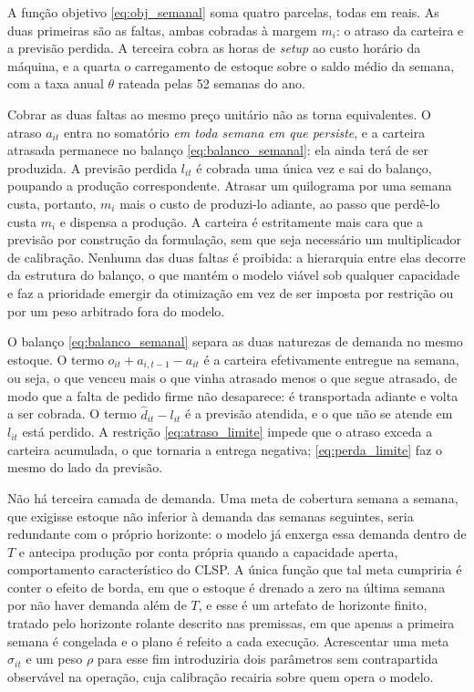 \documentclass[fleqn,12pt,a4paper]{article}
\begin{document}
A função objetivo \eqref{eq:obj_semanal} soma quatro parcelas, todas em reais. As duas primeiras são as faltas, ambas cobradas à margem $m_i$: o atraso da carteira e a previsão perdida. A terceira cobra as horas de \textit{setup} ao custo horário da máquina, e a quarta o carregamento de estoque sobre o saldo médio da semana, com a taxa anual $\theta$ rateada pelas 52 semanas do ano.

Cobrar as duas faltas ao mesmo preço unitário não as torna equivalentes. O atraso $a_{it}$ entra no somatório \emph{em toda semana em que persiste}, e a carteira atrasada permanece no balanço \eqref{eq:balanco_semanal}: ela ainda terá de ser produzida. A previsão perdida $l_{it}$ é cobrada uma única vez e sai do balanço, poupando a produção correspondente. Atrasar um quilograma por uma semana custa, portanto, $m_i$ mais o custo de produzi-lo adiante, ao passo que perdê-lo custa $m_i$ e dispensa a produção. A carteira é estritamente mais cara que a previsão por construção da formulação, sem que seja necessário um multiplicador de calibração. Nenhuma das duas faltas é proibida: a hierarquia entre elas decorre da estrutura do balanço, o que mantém o modelo viável sob qualquer capacidade e faz a prioridade emergir da otimização em vez de ser imposta por restrição ou por um peso arbitrado fora do modelo.

O balanço \eqref{eq:balanco_semanal} separa as duas naturezas de demanda no mesmo estoque. O termo $o_{it} + a_{i,t-1} - a_{it}$ é a carteira efetivamente entregue na semana, ou seja, o que venceu mais o que vinha atrasado menos o que segue atrasado, de modo que a falta de pedido firme não desaparece: é transportada adiante e volta a ser cobrada. O termo $\hat{d}_{it} - l_{it}$ é a previsão atendida, e o que não se atende em $l_{it}$ está perdido. A restrição \eqref{eq:atraso_limite} impede que o atraso exceda a carteira acumulada, o que tornaria a entrega negativa; \eqref{eq:perda_limite} faz o mesmo do lado da previsão.

Não há terceira camada de demanda. Uma meta de cobertura semana a semana, que exigisse estoque não inferior à demanda das semanas seguintes, seria redundante com o próprio horizonte: o modelo já enxerga essa demanda dentro de $T$ e antecipa produção por conta própria quando a capacidade aperta, comportamento característico do CLSP. A única função que tal meta cumpriria é conter o efeito de borda, em que o estoque é drenado a zero na última semana por não haver demanda além de $T$, e esse é um artefato de horizonte finito, tratado pelo horizonte rolante descrito nas premissas, em que apenas a primeira semana é congelada e o plano é refeito a cada execução. Acrescentar uma meta $\sigma_{it}$ e um peso $\rho$ para esse fim introduziria dois parâmetros sem contrapartida observável na operação, cuja calibração recairia sobre quem opera o modelo.
\end{document}
